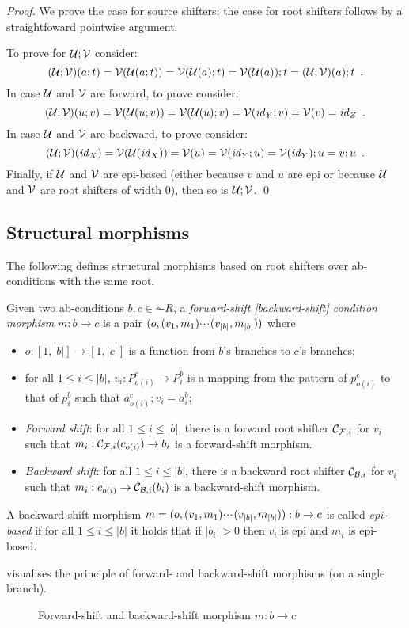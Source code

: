 \begin{proof}
We prove the case for source shifters; the case for root shifters follows by a straightfoward pointwise argument.

To prove  for $\mathcal{U};\mathcal{V}$ consider:
\[ (\mathcal{U};\mathcal{V})(a;t) = \mathcal{V}(\mathcal{U}(a;t))= \mathcal{V}(\mathcal{U}(a);t)=\mathcal{V}(\mathcal{U}(a));t=(\mathcal{U};\mathcal{V})(a);t \enspace. \]
In case $\mathcal{U}$ and $\mathcal{V}$ are forward, to prove  consider:
\[ (\mathcal{U};\mathcal{V})(u;v) = \mathcal{V}(\mathcal{U}(u;v)) = \mathcal{V}(\mathcal{U}(u);v) = \mathcal{V}(\mathit{id}_Y;v) = \mathcal{V}(v) = \mathit{id}_Z \enspace. \]
In case $\mathcal{U}$ and $\mathcal{V}$ are backward, to prove  consider:
\[ (\mathcal{U};\mathcal{V})(\mathit{id}_X) = \mathcal{V}(\mathcal{U}(\mathit{id}_X)) = \mathcal{V}(u) = \mathcal{V}(\mathit{id}_Y;u) = \mathcal{V}(\mathit{id}_Y);u = v;u \enspace. \]
Finally, if $\mathcal{U}$ and $\mathcal{V}$ are epi-based (either because $v$ and $u$ are epi or because $\mathcal{U}$ and $\mathcal{V}$ are root shifters of width 0), then so is $\mathcal{U};\mathcal{V}$.
\qed
\end{proof}

\subsection{Structural morphisms}

The following defines structural morphisms based on root shifters over ab-conditions with the same root.

\begin{definition}
  Given two ab-conditions $b,c \in \AC{R}$, a \emph{forward-shift [backward-shift] condition morphism} $m: b \to c$ is a pair $(o,(v_1,m_1){\cdotp\mkern-2mu\cdotp\mkern-2mu\cdotp\mkern1mu} (v_{|b|},m_{|b|}))$ where
  \begin{itemize}
  \item $o:[1,|b|]\to[1,|c|]$ is a function from $b$'s branches to $c$'s branches;
  \item for all $1\leq i\leq |b|$, $v_i:P^c_{o(i)}\to P^b_i$ is a mapping from the pattern of $p^c_{o(i)}$ to that of $p^b_i$ such that $a^c_{o(i)};v_i=a^b_i$;
  \item\emph{Forward shift}: for all $1\leq i\leq |b|$, there is a forward root shifter $\mathcal{C}_{\mathcal{F},i}$ for $v_i$ such that $m_i:\mathcal{C}_{\mathcal{F},i}(c_{o(i)})\to b_i$ is a forward-shift morphism.
  \item\emph{Backward shift}: for all $1\leq i\leq |b|$, there is a backward root shifter $\mathcal{C}_{\mathcal{B},i}$ for $v_i$ such that $m_i:c_{o(i)}\to \mathcal{C}_{\mathcal{B},i}(b_i)$ is a backward-shift morphism.
  \end{itemize}
A backward-shift morphism  $m = (o,(v_1,m_1){\cdotp\mkern-2mu\cdotp\mkern-2mu\cdotp\mkern1mu} (v_{|b|},m_{|b|})): b \to c$ is called \emph{epi-based} if for all $1 \leq i \leq |b|$ it holds that if $|b_i| > 0$ then $v_i$ is epi and $m_i$ is epi-based.
\end{definition}
%
 visualises the principle of forward- and backward-shift morphisms (on a single branch).
%
\begin{figure}
\centering

\caption{Forward-shift and backward-shift morphism $m:b\to c$}
\end{figure}

